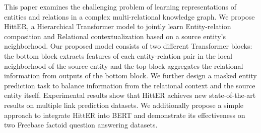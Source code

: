 This paper examines the challenging problem of learning representations of entities and relations in a complex multi-relational knowledge graph. We propose HittER, a Hierarchical Transformer model to jointly learn Entity-relation composition and Relational contextualization based on a source entity's neighborhood. Our proposed model consists of two different Transformer blocks: the bottom block extracts features of each entity-relation pair in the local neighborhood of the source entity and the top block aggregates the relational information from outputs of the bottom block. We further design a masked entity prediction task to balance information from the relational context and the source entity itself. Experimental results show that HittER achieves new state-of-the-art results on multiple link prediction datasets. We additionally propose a simple approach to integrate HittER into BERT and demonstrate its effectiveness on two Freebase factoid question answering datasets.

